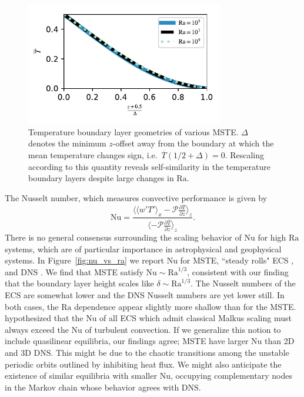 \documentclass[reprint,amsmath,amssymb,aps,nofootinbib]{revtex4-1}
\newcommand\Ra{\mathrm{Ra}}
\newcommand\Nu{\mathrm{Nu}}
\begin{document}
\begin{figure}
    \centering
    \includegraphics[width=3.4in]{b0_delta.pdf}
    \caption{Temperature boundary layer geometries of various MSTE. 
    $\Delta$ denotes the minimum $z$-offset away from the boundary at which the mean temperature changes sign, i.e.~$\overline{T}(1/2 + \Delta) = 0$. 
    Rescaling according to this quantity reveals self-similarity in the temperature boundary layers despite large changes in $\Ra$.}
    \label{fig:b0_delta}
\end{figure}


The Nusselt number, which measures convective performance is given by
\begin{equation}
    \Nu = \frac{\langle \langle w'T' \rangle_x - \mathcal{P}\frac{\partial \overline{T}}{\partial z} \rangle_z}{\langle- \mathcal{P}\frac{\partial \overline{T}}{\partial z} \rangle_z}.
\end{equation}
There is no general consensus surrounding the scaling behavior of $\Nu$ for high $\Ra$ systems, which are of particular importance in astrophysical and geophysical systems. In Figure~\ref{fig:nu_vs_ra} we report $\Nu$ for MSTE, ``steady rolls" ECS \cite{Wen}, and DNS \cite{Scheel_2016, Johnston}. 
We find that MSTE satisfy $\Nu \sim\Ra^{1/3}$, consistent with our finding that the boundary layer height scales like $\delta \sim \Ra^{1/3}$.
The Nusselt numbers of the ECS are somewhat lower and the DNS Nusselt numbers are yet lower still.
In both cases, the $\Ra$ dependence appear slightly more shallow than for the MSTE.
\cite{Wen} hypothesized that the $\Nu$ of all ECS which admit classical Malkus scaling must always exceed the $\Nu$ of turbulent convection.
If we generalize this notion to include quasilinear equilibria, our findings agree; MSTE have larger $\Nu$ than 2D and 3D DNS.
This might be due to the chaotic transitions among the unstable periodic orbits outlined by \cite{Yalniz, Cvitanovic} inhibiting heat flux. 
We might also anticipate the existence of similar equilibria with smaller $\Nu$, occupying complementary nodes in the Markov chain whose behavior agrees with DNS. 
\end{document}
